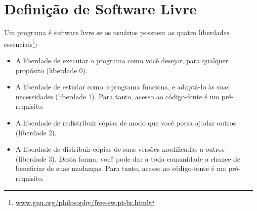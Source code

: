 \chapter{Definição de Software Livre}
\label{ann:softlivre}

Um programa é software livre se os usuários possuem as quatro liberdades essenciais\footnote{\url{www.gnu.org/philosophy/free-sw.pt-br.html}}:
\begin{itemize}
  \item A liberdade de executar o programa como você desejar, para qualquer propósito (liberdade 0).
  \item A liberdade de estudar como o programa funciona, e adaptá-lo às suas necessidades (liberdade 1). Para tanto, acesso ao código-fonte é um pré-requisito.
  \item A liberdade de redistribuir cópias de modo que você possa ajudar outros (liberdade 2).
  \item A liberdade de distribuir cópias de suas versões modificadas a outros (liberdade 3). Desta forma, você pode dar a toda comunidade a chance de beneficiar de suas mudanças. Para tanto, acesso ao código-fonte é um pré-requisito.
\end{itemize}
